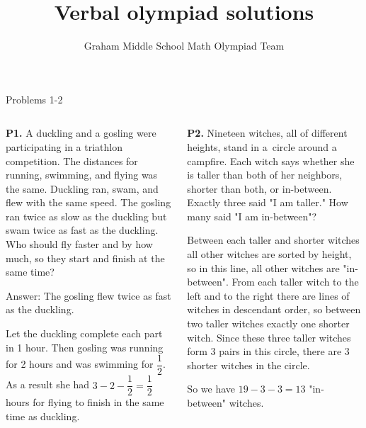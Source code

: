 \documentclass[9pt,aspectratio=169]{beamer}
\title{Verbal olympiad solutions}
\subtitle[Graham Middle School]{Graham Middle School Math Olympiad Team}
\begin{document}
\maketitle

\begin{frame}{Problems 1-2}
  \begin{columns}[T]
    \begin{column}{0.5\textwidth}
      \begin{problem}
        \textbf{P1.} A duckling and a gosling were participating in a triathlon competition. The
        distances for running, swimming, and flying was the same. Duckling ran, swam, and flew with the same speed. The gosling ran twice as slow as the duckling
        but swam twice as fast as the duckling. Who should fly faster and by how much, so they start and finish at the same time?
      \end{problem}\pause

      Answer: The gosling flew twice as fast as the duckling.

      Let the duckling complete each part in 1 hour. Then gosling was running for 2 hours and was swimming for $\dfrac{1}{2}$. As a result she had $3 - 2 - \dfrac{1}{2} = \dfrac{1}{2}$ hours for flying to finish in the same time as duckling. \pause
    \end{column}
    \begin{column}{0.5\textwidth}
      \begin{problem}
        \textbf{P2.} Nineteen witches, all of different heights, stand in a~circle around a campfire.
        Each witch says whether she is taller than both of her neighbors, shorter than both,
        or in-between. Exactly three said "I am taller." How many said "I am in-between"?
      \end{problem}\pause
      Between each taller and shorter witches all other witches are sorted by height, so in this line, all other witches are "in-between". From each taller witch to the left and to the right there are lines of witches in descendant order, so between two taller witches exactly one shorter witch. Since these three taller witches form $3$ pairs in this circle, there are $3$ shorter witches in the circle. 
      
      So we have $19 - 3 - 3 = 13$ "in-between" witches. 
    \end{column}
  \end{columns}
\end{frame}
\end{document}
